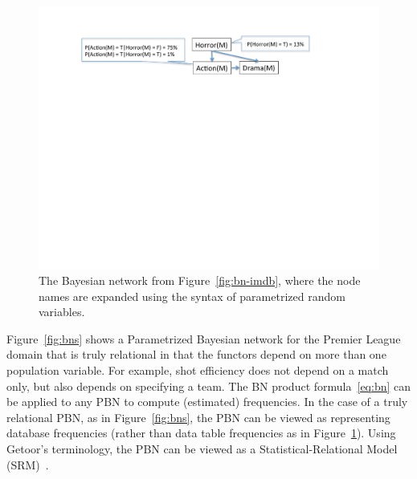 {{\begin{figure}[t]
 		\centering
 		\includegraphics[width=1\textwidth] 
 		{movie-bn2.pdf}
 		\caption[Example of conditional and marginal probabilities computed from a toy Bayesian network structure. ]{The Bayesian network from Figure~\ref{fig:bn-imdb}, where the node names are expanded using the syntax of parametrized random variables.
 			\label{fig:bn-imdb2}
 		}
 	\end{figure}


Figure~\ref{fig:bns} shows a Parametrized Bayesian network for the Premier League domain that is truly relational in that the functors depend on more than one population variable. For example, shot efficiency does not depend on a match only, but also depends on specifying a team. The BN product formula~\eqref{eq:bn} can be applied to any PBN to compute (estimated) frequencies. In the case of a truly relational PBN, as in Figure~\ref{fig:bns}, the PBN can be viewed as representing database frequencies (rather than data table frequencies as in Figure~\ref{fig:bn-imdb2}). Using Getoor's terminology, the PBN can be viewed as a Statistical-Relational Model (SRM)~\citep{Getoor2001a,Schulte2014,Schulte2017a}.


}}
